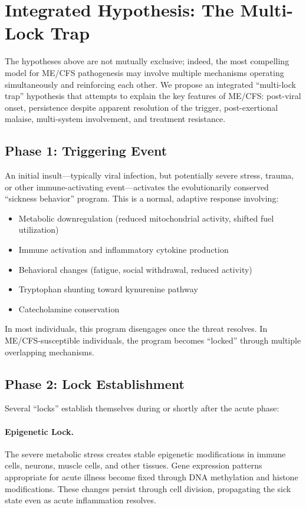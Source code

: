 \section{Integrated Hypothesis: The Multi-Lock Trap}
\label{sec:multi-lock-trap}

The hypotheses above are not mutually exclusive; indeed, the most compelling model for ME/CFS pathogenesis may involve multiple mechanisms operating simultaneously and reinforcing each other. We propose an integrated ``multi-lock trap'' hypothesis that attempts to explain the key features of ME/CFS: post-viral onset, persistence despite apparent resolution of the trigger, post-exertional malaise, multi-system involvement, and treatment resistance.

\subsection{Phase 1: Triggering Event}

An initial insult---typically viral infection, but potentially severe stress, trauma, or other immune-activating event---activates the evolutionarily conserved ``sickness behavior'' program. This is a normal, adaptive response involving:

\begin{itemize}
    \item Metabolic downregulation (reduced mitochondrial activity, shifted fuel utilization)
    \item Immune activation and inflammatory cytokine production
    \item Behavioral changes (fatigue, social withdrawal, reduced activity)
    \item Tryptophan shunting toward kynurenine pathway
    \item Catecholamine conservation
\end{itemize}

In most individuals, this program disengages once the threat resolves. In ME/CFS-susceptible individuals, the program becomes ``locked'' through multiple overlapping mechanisms.

\subsection{Phase 2: Lock Establishment}

Several ``locks'' establish themselves during or shortly after the acute phase:

\paragraph{Epigenetic Lock.} The severe metabolic stress creates stable epigenetic modifications in immune cells, neurons, muscle cells, and other tissues. Gene expression patterns appropriate for acute illness become fixed through DNA methylation and histone modifications. These changes persist through cell division, propagating the sick state even as acute inflammation resolves.

